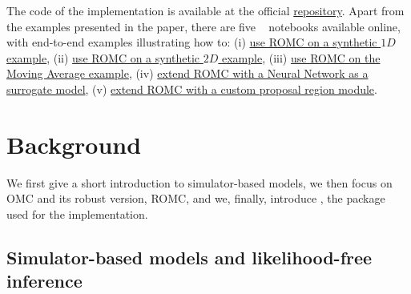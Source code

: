 \documentclass[nojss]{jss}
\begin{document}
The code of the implementation is available at the official 
\href{https://github.com/elfi-dev/elfi}{repository}. Apart from the
examples presented in the paper, there are five ~\citet{Bisong2019} notebooks available online, with
end-to-end examples illustrating how to: (i)
\href{https://colab.research.google.com/drive/1lGRp0XrNfZ64NN0ASB_tYEKowXwlveDC?usp=sharing}{use ROMC
  on a synthetic \(1D\) example}, (ii)
\href{https://colab.research.google.com/drive/1Fof_WmCi1YizzSI_63aEsbLXsno5gSZ3?usp=sharing}{use ROMC
  on a synthetic \(2D\) example}, (iii)
\href{https://colab.research.google.com/drive/1nkdACQ370SSc0KB1bHv4sBRaxMlMqoNH?usp=sharing}{use ROMC
  on the Moving Average example}, (iv)
\href{https://colab.research.google.com/drive/1_jHVxPSH3XcNOORZJpLU0SPzs0PF8CQ5?usp=sharing}{extend ROMC with a Neural Network as a surrogate model}, (v)
\href{https://colab.research.google.com/drive/1RzB-V1QueP1y1nyzv_VOqR1nVz3DUH3v?usp=sharing}{extend ROMC with a custom proposal region module}.




\section[Background]{Background}

We first give a short introduction to simulator-based models, we then
focus on OMC and its robust version, ROMC, and we, finally, introduce
, the  package used for the implementation.

\subsection{Simulator-based models and likelihood-free inference}
\end{document}
